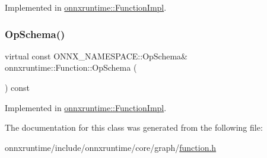 Implemented in \mbox{\hyperlink{classonnxruntime_1_1FunctionImpl_ad003c6cab0d96bd8cd96d2bb5abfce50}{onnxruntime\+::\+Function\+Impl}}.

\mbox{\label{classonnxruntime_1_1Function_aad1b1f67422088275cb4ce6470aa906a}} 
\subsubsection{\texorpdfstring{Op\+Schema()}{OpSchema()}\hspace{0.1cm}{\footnotesize\ttfamily [2/2]}}
{\footnotesize\ttfamily virtual const O\+N\+N\+X\+\_\+\+N\+A\+M\+E\+S\+P\+A\+C\+E\+::\+Op\+Schema\& onnxruntime\+::\+Function\+::\+Op\+Schema (\begin{DoxyParamCaption}{ }\end{DoxyParamCaption}) const\hspace{0.3cm}{\ttfamily [pure virtual]}}



Implemented in \mbox{\hyperlink{classonnxruntime_1_1FunctionImpl_ad003c6cab0d96bd8cd96d2bb5abfce50}{onnxruntime\+::\+Function\+Impl}}.



The documentation for this class was generated from the following file\+:\begin{DoxyCompactItemize}
\item 
onnxruntime/include/onnxruntime/core/graph/\mbox{\hyperlink{include_2onnxruntime_2core_2graph_2function_8h}{function.\+h}}\end{DoxyCompactItemize}
